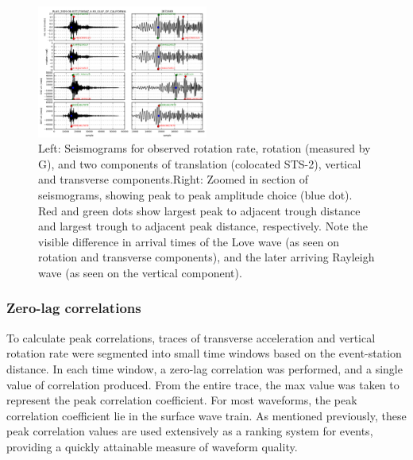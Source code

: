 \documentclass{gji}
\begin{document}
\begin{figure}
\centerline{\includegraphics[width=0.5\textwidth]{observation_waveforms}}
\caption{Left: Seismograms for observed rotation rate, rotation (measured by G), and two components of translation (colocated STS-2), vertical and transverse components.\newline Right: Zoomed in section of seismograms, showing peak to peak amplitude choice (blue dot). Red and green dots show largest peak to adjacent trough distance and largest trough to adjacent peak distance, respectively. Note the visible difference in arrival times of the Love wave (as seen on rotation and transverse components), and the later arriving Rayleigh wave (as seen on the vertical component). }
\label{fig:obswav}
\end{figure}


\subsubsection{Zero-lag correlations}
To calculate peak correlations, traces of transverse acceleration and vertical rotation rate were segmented into small time windows based on the event-station distance. In each time window, a zero-lag correlation was performed, and a single value of correlation produced. From the entire trace, the max value was taken to represent the peak correlation coefficient. For most waveforms, the peak correlation coefficient lie in the surface wave train. As mentioned previously, these peak correlation values are used extensively as a ranking system for events, providing a quickly attainable measure of waveform quality.
\end{document}
